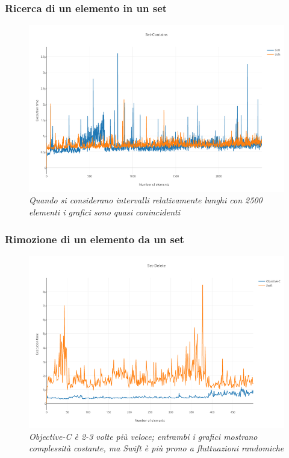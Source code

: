 \subsubsection{Ricerca di un elemento in un set}
\begin{figure}[H]
      \centering
      \includegraphics[scale=0.50]{immagini/set_contains.png}
            \vspace{0.8cm}
            \caption{\textit{Quando si considerano intervalli relativamente lunghi con 2500 elementi i grafici sono quasi conincidenti}}
\end{figure}
\subsubsection{Rimozione di un elemento da un set}
\begin{figure}[H]
      \centering
      \includegraphics[scale=0.50]{immagini/set_delete.png}
            \vspace{0.8cm}
            \caption{\textit{Objective-C è 2-3 volte più veloce; entrambi i grafici mostrano complessità costante, ma Swift è più prono a fluttuazioni randomiche}}
\end{figure}
